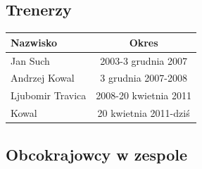 \documentclass{article}
\begin{document}
\subsection{Trenerzy}
\begin{tabular}{|l|c|} \hline
Nazwisko	&Okres\\ \hline
Jan Such	&2003-3 grudnia 2007\\ \hline
Andrzej Kowal	&3 grudnia 2007-2008\\ \hline
Ljubomir Travica	&2008-20 kwietnia 2011\\ \hline
Kowal	&20 kwietnia 2011-dziś\\ \hline
\end{tabular}
\subsection{Obcokrajowcy w zespole}
\end{document}
